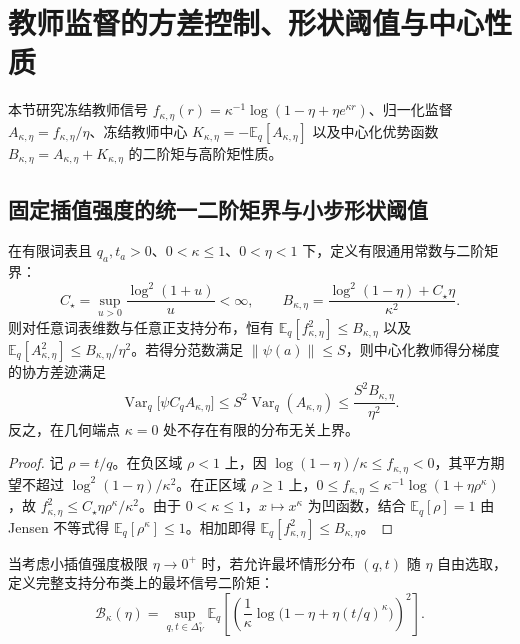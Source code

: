 \documentclass[lang=cn,scheme=chinese,openany]{elegantbook}
\newcommand{\E}{\mathbb E}
\newcommand{\Var}{\operatorname{Var}}
\begin{document}
\section{教师监督的方差控制、形状阈值与中心性质}
\label{sec:proximal-teacher-center}

本节研究冻结教师信号 $f_{\kappa,\eta}(r)=\kappa^{-1}\log(1-\eta+\eta e^{\kappa r})$、归一化监督 $A_{\kappa,\eta}=f_{\kappa,\eta}/\eta$、冻结教师中心 $K_{\kappa,\eta}=-\E_q[A_{\kappa,\eta}]$ 以及中心化优势函数 $B_{\kappa,\eta}=A_{\kappa,\eta}+K_{\kappa,\eta}$ 的二阶矩与高阶矩性质。

\subsection{固定插值强度的统一二阶矩界与小步形状阈值}

\begin{theorem}
\label{thm:proximal-power-variance}
在有限词表且 $q_a,t_a>0$、$0<\kappa\le 1$、$0<\eta<1$ 下，定义有限通用常数与二阶矩界：
\begin{equation}
 C_\star=\sup_{u>0}\frac{\log^2(1+u)}{u}<\infty,\qquad
 B_{\kappa,\eta}=\frac{\log^2(1-\eta)+C_\star\eta}{\kappa^2}.
\end{equation}
则对任意词表维数与任意正支持分布，恒有 $\E_q[f_{\kappa,\eta}^2]\le B_{\kappa,\eta}$ 以及 $\E_q[A_{\kappa,\eta}^2]\le B_{\kappa,\eta}/\eta^2$。若得分范数满足 $\|\psi(a)\|\le S$，则中心化教师得分梯度的协方差迹满足
\begin{equation}
 \Var_q\bigl[\psi C_q A_{\kappa,\eta}\bigr]\le S^2\Var_q(A_{\kappa,\eta})
 \le \frac{S^2 B_{\kappa,\eta}}{\eta^2}.
\end{equation}
反之，在几何端点 $\kappa=0$ 处不存在有限的分布无关上界。
\end{theorem}
\begin{proof}
记 $\rho=t/q$。在负区域 $\rho<1$ 上，因 $\log(1-\eta)/\kappa\le f_{\kappa,\eta}<0$，其平方期望不超过 $\log^2(1-\eta)/\kappa^2$。在正区域 $\rho\ge 1$ 上，$0\le f_{\kappa,\eta}\le\kappa^{-1}\log(1+\eta\rho^\kappa)$，故 $f_{\kappa,\eta}^2\le C_\star\eta\rho^\kappa/\kappa^2$。由于 $0<\kappa\le 1$，$x\mapsto x^\kappa$ 为凹函数，结合 $\E_q[\rho]=1$ 由 Jensen 不等式得 $\E_q[\rho^\kappa]\le 1$。相加即得 $\E_q[f_{\kappa,\eta}^2]\le B_{\kappa,\eta}$。
\end{proof}

当考虑小插值强度极限 $\eta\to 0^+$ 时，若允许最坏情形分布 $(q,t)$ 随 $\eta$ 自由选取，定义完整支持分布类上的最坏信号二阶矩：
\begin{equation}
 \mathcal B_\kappa(\eta)
 =\sup_{q,t\in\Delta_V^\circ}\E_q\left[
 \left(\frac1\kappa\log\bigl(1-\eta+\eta(t/q)^\kappa\bigr)\right)^2
 \right].
\end{equation}
\end{document}
